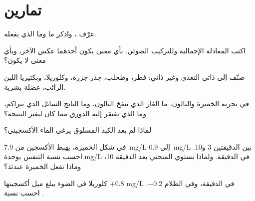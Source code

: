 \section{تمارين}

\begin{exercise}[$\star$]\label{exo:g10:cell-metabolism:1}
عرّف ، واذكر ما  وما الذي يفعله.
\end{exercise}

\begin{exercise}[$\star$]\label{exo:g10:cell-metabolism:2}
اكتب المعادلة الإجمالية  وللتركيب الضوئي. بأي معنى يكون
أحدهما عكس الآخر، وبأي معنى لا يكون؟
\end{exercise}

\begin{exercise}[$\star$]\label{exo:g10:cell-metabolism:3}
صنّف إلى ذاتي التغذي وغير ذاتي: فطر، وطحلب،  جذر جزرة، وكلوريلا،
وبكتيريا اللبن الرائب،  عضلة بشرية.
\end{exercise}

\begin{exercise}[$\star$]\label{exo:g10:cell-metabolism:4}
في تجربة الخميرة والبالون، ما الغاز الذي ينفخ البالون، وما الناتج
السائل الذي يتراكم، وما الذي يفتقر إليه الدورق مما كان ليغير النتيجة؟
\end{exercise}

\begin{exercise}[$\star$]\label{exo:g10:cell-metabolism:5}
لماذا لم يعد الكبد المسلوق يرغي الماء الأكسجيني؟
\end{exercise}

\begin{exercise}[$\star\star$]\label{exo:g10:cell-metabolism:6}
في شكل الخميرة، يهبط الأكسجين من \qty{7.9}{mg/L} إلى \qty{0.9}{mg/L}
بين الدقيقتين 3 و10. احسب نسبة التنفس بوحدة \unit{mg/L} في الدقيقة.
ولماذا يستوي المنحني بعد الدقيقة 10، وماذا تفعل الخميرة عندئذ؟
\end{exercise}

\begin{exercise}[$\star\star$]\label{exo:g10:cell-metabolism:7}
كلوريلا في الضوء يبلغ ميل أكسجينها $+0.8$ \unit{mg/L} في الدقيقة، وفي
الظلام $-0.2$. احسب نسبة .
\end{exercise}

